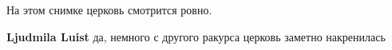  
 
 
 
 

На этом снимке церковь смотрится ровно.

\textbf{Ljudmila Luist} да, немного с другого ракурса церковь заметно накренилась
